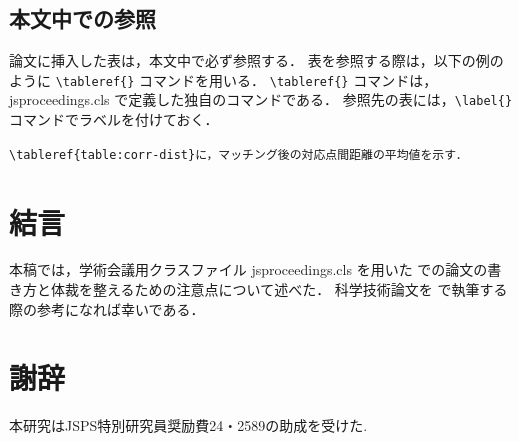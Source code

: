 \documentclass[uplatex, twocolumn, 9pt]{jsproceedings}
\begin{document}
\subsection{本文中での参照}
論文に挿入した表は，本文中で必ず参照する．
表を参照する際は，以下の例のように \verb*|\tableref{}| コマンドを用いる．
\verb*|\tableref{}| コマンドは，jsproceedings.cls で定義した独自のコマンドである．
参照先の表には，\verb*|\label{}| コマンドでラベルを付けておく．
\begin{description}[style=nextline]
  \item[\LaTeX ソース]%
  \verb|\tableref{table:corr-dist}に，マッチング後の対応点間距離の平均値を示す．|
  \item[出力]%
\end{description}


\section{結言}
本稿では，学術会議用クラスファイル jsproceedings.cls を用いた \LaTeXe での論文の書き方と体裁を整えるための注意点について述べた．
科学技術論文を \LaTeXe で執筆する際の参考になれば幸いである．

\section*{謝辞}
本研究はJSPS特別研究員奨励費24・2589の助成を受けた.
\end{document}
